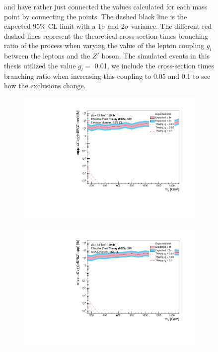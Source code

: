 \documentclass[12pt, a4paper]{book}
\begin{document}
\begin{figure}[!ht]
{   and have rather just connected the values calculated for each mass point by connecting the points. The dashed black line is the expected 95\% CL limit with a 1$\sigma$ and 2$\sigma$ variance. 
   The different red dashed lines represent the theoretical cross-section times branching ratio of the process when varying the value of the lepton coupling $g_l$ between the leptons and the $Z'$ boson. The simulated events in this thesis utilized the value $g_l=$ 0.01, we include the cross-section times branching ratio when increasing this coupling to 0.05 and 0.1 to see how the exclusions change.  }\label{fig:EFT_HDS_exclusion_ee_uu}
\end{figure}
\begin{figure}[!ht]
	\centering
	\begin{subfigure}[b]{0.49\textwidth}
      \centering
      \includegraphics[width=1\textwidth]{Limits/Model_independent/50-100/EFT_HDS/mass_exclusion_ee.pdf}
   \end{subfigure}
   \hfill
   \begin{subfigure}[b]{0.49\textwidth}
      \centering
      \includegraphics[width=1\textwidth]{Limits/Model_independent/50-100/EFT_HDS/mass_exclusion_uu.pdf}

\end{subfigure}
\end{figure}
\end{document}
